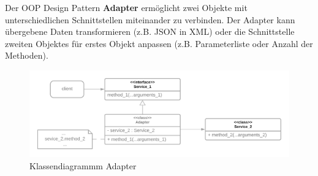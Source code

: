 Der OOP Design Pattern \textbf{Adapter} ermöglicht zwei Objekte mit unterschiedlichen Schnittstellen miteinander zu verbinden.
Der Adapter kann übergebene Daten transformieren (z.B. JSON in XML) 
oder die Schnittstelle zweiten Objektes für erstes Objekt anpassen
(z.B. Parameterliste oder Anzahl der Methoden).

\begin{figure}[H]
    \centering
    \includegraphics[width=1\textwidth]{Images/OOPAdapter.png}
    \caption[UML Adapter]{Klassendiagrammm Adapter}
    \label{fig:cd_adapter }
\end{figure}